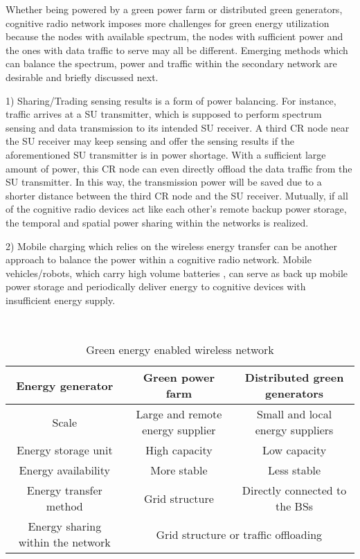 \documentclass[journal,12pt,onecolumn]{IEEEtran}
\begin{document}
{Whether being powered by a green power farm or distributed green generators, cognitive radio network imposes more challenges for green energy utilization because the nodes with available spectrum, the nodes with sufficient power and the ones with data traffic to serve may all be different. Emerging methods which can balance the spectrum, power and traffic within the secondary network are desirable and briefly discussed next.

1) Sharing/Trading sensing results is a form of power balancing. For instance, traffic arrives at a SU transmitter, which is supposed to perform spectrum sensing and data transmission to its intended SU receiver. A third CR node near the SU receiver may keep sensing and offer the sensing results if the aforementioned SU transmitter is in power shortage. With a sufficient large amount of power, this CR node can even directly offload the data traffic from the SU transmitter. In this way, the transmission power will be saved due to a shorter distance between the third CR node and the SU receiver. Mutually, if all of the cognitive radio devices act like each other's remote backup power storage, the temporal and spatial power sharing within the networks is realized.

2) Mobile charging which relies on the wireless energy transfer can be another approach to balance the power within a cognitive radio network. Mobile vehicles/robots, which carry high volume batteries \cite{6502505}, can serve as back up mobile power storage and periodically deliver energy to cognitive devices with insufficient energy supply.

\begin{table*}[t]
\vspace{-3em}
\caption{Green energy enabled wireless network} \centering\  \begin{tabular}{|c|c|c|} \hline                        Energy generator&	Green power farm	&Distributed green generators\\\hline
Scale&	Large and remote energy supplier	&Small and local energy suppliers\\\hline
Energy storage unit	&High capacity	&Low capacity\\\hline
Energy availability	&More stable	&Less stable\\\hline
Energy transfer method&	Grid structure	&Directly connected to the BSs\\\hline
Energy sharing within the network	&\multicolumn{2}{|c|}{Grid structure or traffic offloading}	\\\hline
\end{tabular}
\label{tab_1}
\end{table*}

}
\end{document}
